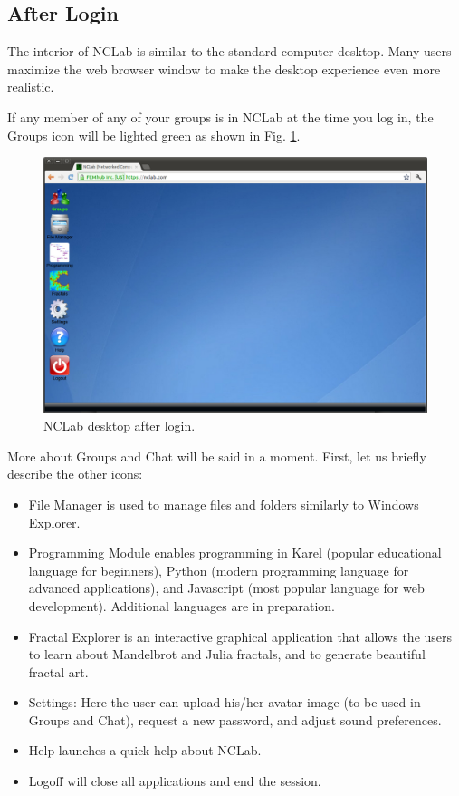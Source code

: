 \documentclass[article,A4,12pt]{llncs}
\begin{document}
\subsection{After Login}

The interior of NCLab is similar to the standard computer desktop. Many users maximize 
the web browser window to make the desktop experience even more realistic.

If any member of any of your groups is in NCLab at the time you log in, the Groups icon 
will be lighted green as shown in Fig. \ref{fig:desktop}. 

\begin{figure}[!ht]
\begin{center}
\includegraphics[width=\textwidth]{img/desktop.png}
\end{center}
\caption{NCLab desktop after login.}
\label{fig:desktop}
\end{figure}

\noindent
More about Groups and Chat will be said in a moment. First, let us briefly 
describe the other icons:

\begin{itemize}
\item File Manager is used to manage files and folders similarly to Windows Explorer. 
\item Programming Module enables programming in Karel (popular educational language for beginners),
      Python (modern programming language for advanced applications), and Javascript 
      (most popular language for web development). Additional languages are in preparation.
\item Fractal Explorer is an interactive graphical application that allows the users
      to learn about Mandelbrot and Julia fractals, and to generate beautiful fractal art.
\item Settings: Here the user can upload his/her avatar image (to be used in Groups and Chat), 
      request a new password, and adjust sound preferences.
\item Help launches a quick help about NCLab.
\item Logoff will close all applications and end the session.
\end{itemize}
\end{document}
